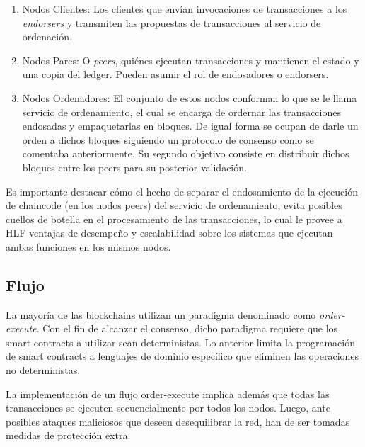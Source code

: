 \begin{enumerate}
	\item Nodos Clientes: Los clientes que env\'ian invocaciones de transacciones a los \emph{endorsers} y transmiten las propuestas de transacciones al servicio de ordenaci\'on.
	
	
	\item Nodos Pares: O \emph{peers}, qui\'enes ejecutan transacciones y mantienen el estado y una copia del ledger. Pueden asumir el rol de endosadores o endorsers.
	
	\item Nodos Ordenadores: El conjunto de estos nodos conforman lo que se le llama servicio de ordenamiento, el cual se encarga de ordernar las transacciones endosadas y empaquetarlas en bloques. De igual forma se ocupan de darle un orden a dichos bloques siguiendo un protocolo de consenso como se comentaba anteriormente. Su segundo objetivo consiste en distribuir dichos bloques entre los peers para su posterior validaci\'on.
	
\end{enumerate}

Es importante destacar c\'omo el hecho de separar el endosamiento de la ejecuci\'on de chaincode (en los nodos peers) del servicio de ordenamiento, evita posibles cuellos de botella en el procesamiento de las transacciones, lo cual le provee a HLF ventajas de desempe\~no y escalabilidad sobre los sistemas que ejecutan ambas funciones en los mismos nodos.
 
\subsection{Flujo}

La mayor\'ia de las blockchains utilizan un paradigma denominado como \emph{order-execute}. Con el fin de alcanzar el consenso, dicho paradigma requiere que los smart contracts a utilizar sean deterministas. Lo anterior limita la programaci\'on de smart contracts a lenguajes de dominio espec\'ifico que eliminen las operaciones no deterministas. 

La implementaci\'on de un flujo order-execute implica adem\'as que todas las transacciones se ejecuten secuencialmente por todos los nodos. Luego, ante posibles ataques maliciosos que deseen desequilibrar la red, han de ser tomadas medidas de protecci\'on extra.

